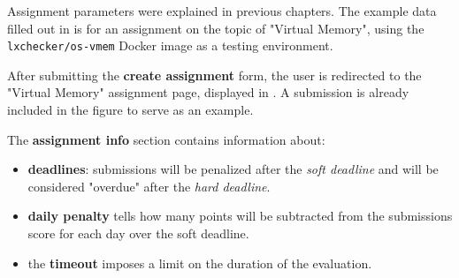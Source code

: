 Assignment parameters were explained in previous chapters. The example data filled out in  is for an assignment on the topic of "Virtual Memory", using the \texttt{lxchecker/os-vmem} Docker image as a testing environment.


After submitting the \textbf{create assignment} form, the user is redirected to the "Virtual Memory" assignment page, displayed in . A submission is already included in the figure to serve as an example.

The \textbf{assignment info} section contains information about:
\begin{itemize}
	\item \textbf{deadlines}: submissions will be penalized after the \textit{soft deadline} and will be considered "overdue" after the \textit{hard deadline}.
	\item \textbf{daily penalty} tells how many points will be subtracted from the submissions score for each day over the soft deadline.
	\item the \textbf{timeout} imposes a limit on the duration of the evaluation.
\end{itemize}





